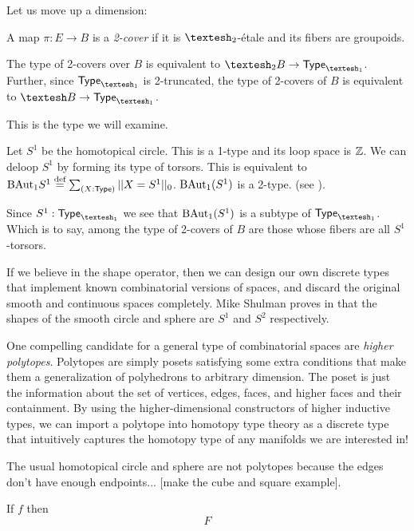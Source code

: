 \documentclass[12pt]{article}
\begin{document}
Let us move up a dimension:

\begin{mydef}
  A map \(\pi:E\to B\) is a \emph{2-cover} if it is \(\shapet\)-étale and its fibers are groupoids.
\end{mydef}

\begin{mylemma}
  The type of 2-covers over \(B\) is equivalent to \(\shapet B \to \Typeo\). Further, since \(\Typeo\) is 2-truncated, the type of 2-covers of \(B\) is equivalent to \(\shape B\to \Typeo\).
\end{mylemma}

This is the type we will examine.

Let \(S^1\) be the homotopical circle. This is a 1-type and its loop space is \(\mathbb{Z}\). We can deloop \(S^1\) by forming its type of torsors. This is equivalent to \(\mathrm{BAut}_1 S^1\stackrel{\textup{def}}{=}\sum_{(X:\mathsf{Type})}||X=S^1||_0\). \(\mathrm{BAut}_1(S^1)\) is a 2-type. (see \cite{buchholtz2023central}).

Since \(S^1:\Typeo\) we see that \(\mathrm{BAut}_1(S^1)\) is a subtype of \(\Typeo\). Which is to say, among the type of 2-covers of \(B\) are those whose fibers are all \(S^1\)-torsors.

If we believe in the shape operator, then we can design our own discrete types that implement known combinatorial versions of spaces, and discard the original smooth and continuous spaces completely. Mike Shulman proves in \cite{shulman_cohesion} that the shapes of the smooth circle and sphere are \(S^1\) and \(S^2\) respectively.

One compelling candidate for a general type of combinatorial spaces are \emph{higher polytopes}. Polytopes are simply posets satisfying some extra conditions that make them a generalization of polyhedrons to arbitrary dimension. The poset is just the information about the set of vertices, edges, faces, and higher faces and their containment. By using the higher-dimensional constructors of higher inductive types, we can import a polytope into homotopy type theory as a discrete type that intuitively captures the homotopy type of any manifolds we are interested in!

The usual homotopical circle and sphere are not polytopes because the edges don't have enough endpoints... [make the cube and square example].

If \( f \) then 
\[ 
F 
\]


\end{document}
